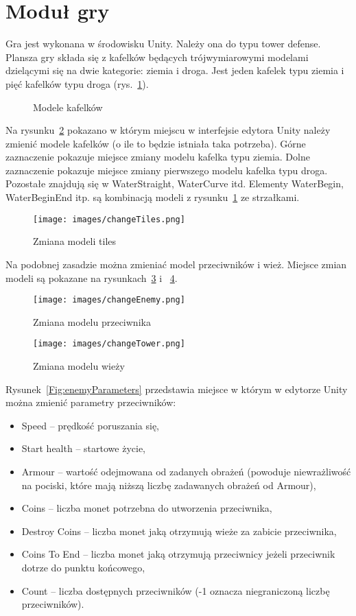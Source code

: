 \section{Moduł gry}

Gra jest wykonana w środowisku Unity. Należy ona do typu tower defense. Plansza gry składa się z kafelków będących trójwymiarowymi modelami dzielącymi się na dwie kategorie: ziemia i droga. Jest jeden kafelek typu ziemia i pięć kafelków typu droga (rys.~\ref{Fig:tiles}).

\begin{figure}

\caption{Modele kafelków}
\label{Fig:tiles}
\end{figure}  

Na rysunku~\ref{Fig:changeTiles} pokazano w którym miejscu w interfejsie edytora Unity należy zmienić modele kafelków (o ile to będzie istniała taka  potrzeba). Górne zaznaczenie pokazuje miejsce zmiany modelu kafelka typu ziemia. Dolne zaznaczenie pokazuje miejsce zmiany pierwszego modelu kafelka typu droga. Pozostałe znajdują się w WaterStraight, WaterCurve itd. Elementy WaterBegin, WaterBeginEnd itp. są kombinacją modeli z rysunku~\ref{Fig:tiles} ze strzałkami. 

\begin{figure}
\texttt{[image: images/changeTiles.png]}
\caption{Zmiana modeli tiles}
\label{Fig:changeTiles}
\end{figure}  

Na podobnej zasadzie można zmieniać model przeciwników i wież. Miejsce zmian modeli są pokazane na rysunkach~\ref{Fig:changeEnemy} i ~\ref{Fig:changeTower}.

\begin{figure}
\texttt{[image: images/changeEnemy.png]}
\caption{Zmiana modelu przeciwnika}
\label{Fig:changeEnemy}
\end{figure}  


\begin{figure}
\texttt{[image: images/changeTower.png]}
\caption{Zmiana modelu wieży}
\label{Fig:changeTower}
\end{figure}  

Rysunek~\ref{Fig:enemyParameters}  przedstawia miejsce w którym w edytorze Unity można zmienić parametry przeciwników:
\begin{itemize}
\item Speed -- prędkość poruszania się,
\item Start health -- startowe życie,
\item Armour -- wartość odejmowana od zadanych obrażeń (powoduje niewrażliwość na pociski, które mają niższą liczbę zadawanych obrażeń od Armour),
\item Coins -- liczba monet potrzebna do utworzenia przeciwnika,
\item Destroy Coins -- liczba monet jaką otrzymują wieże za zabicie przeciwnika,
\item Coins To End -- liczba monet jaką otrzymują przeciwnicy jeżeli przeciwnik dotrze do punktu końcowego,
\item Count -- liczba dostępnych przeciwników (-1 oznacza niegraniczoną liczbę przeciwników).  
\end{itemize}

